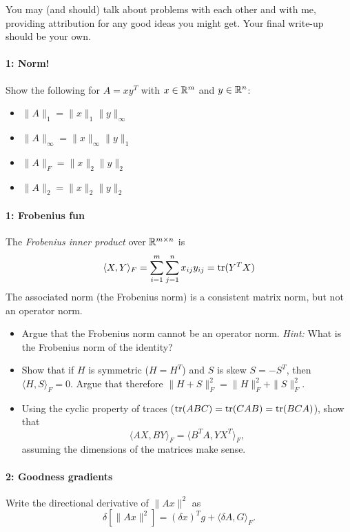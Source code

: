 \documentclass[12pt, leqno]{article} %
\begin{document}

You may (and should) talk about problems with each other and with me,
providing attribution for any good ideas you might get.  Your final
write-up should be your own.


\paragraph*{1: Norm!}
Show the following for $A = xy^T$ with $x \in \mathbb{R}^m$ and $y \in
\mathbb{R}^n$:
\begin{itemize}
\item $\|A\|_1 = \|x\|_1 \|y\|_\infty$
\item $\|A\|_\infty = \|x\|_\infty \|y\|_1$
\item $\|A\|_F = \|x\|_2 \|y\|_2$
\item $\|A\|_2 = \|x\|_2 \|y\|_2$
\end{itemize}

\paragraph*{1: Frobenius fun}
The {\em Frobenius inner product} over 
$\mathbb{R}^{m \times n}$ is
\[
  \langle X, Y \rangle_F
  = \sum_{i=1}^m \sum_{j=1}^n x_{ij} y_{ij}
  = \operatorname{tr}(Y^T X)
\]
The associated norm (the Frobenius norm) is a consistent matrix norm,
but not an operator norm.
\begin{itemize}
\item Argue that the Frobenius norm cannot be an operator norm.
  {\em Hint: } What is the Frobenius norm of the identity?
\item Show that if $H$ is symmetric ($H = H^T$) and $S$ is skew
  $S = -S^T$, then $\langle H, S \rangle_F = 0$.  Argue that therefore
  $\|H+S\|_F^2 = \|H\|_F^2 + \|S\|_F^2$.
\item Using the cyclic property of traces ($\operatorname{tr}(ABC) = \operatorname{tr}(CAB) =
  \operatorname{tr}(BCA)$), show that
  \[
    \langle AX, BY \rangle_F = \langle B^T A, YX^T \rangle_F,
  \]
  assuming the dimensions of the matrices make sense.
\end{itemize}

\paragraph*{2: Goodness gradients}
Write the directional derivative of $\|Ax\|^2$ as
\[
  \delta\left[ \|Ax\|^2 \right] = (\delta x)^T g + \langle \delta A, G \rangle_F.
\]
  
\end{document}
